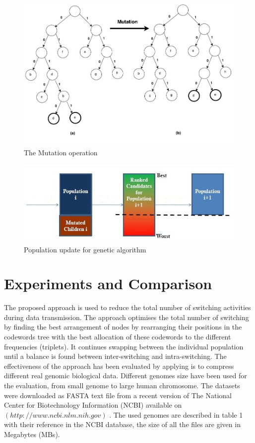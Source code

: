 \documentclass[preprint,12pt]{elsarticle}
\begin{document}
\begin{figure}[tbph]
\begin{center}
\includegraphics[scale=0.4]{Images/figure2.jpg}
\caption{The Mutation operation}
\end{center}
\label{Fig2}
\end{figure}

\begin{figure}[tbph]
\begin{center}
\includegraphics[scale=0.7]{Images/Drawing_1.jpg}
\caption{Population update for genetic algorithm}
\end{center}
\label{Fig3}
\end{figure}


\section{Experiments and Comparison}
The proposed approach is used to reduce the total number of switching activities during data transmission. The approach optimises the total number of switching by  finding  the best arrangement of nodes by rearranging their positions in the codewords tree with the best allocation of these codewords to the different frequencies (triplets). It continues swapping between the individual population  until a balance is found between inter-switching and intra-switching. The effectiveness of the approach has been evaluated by applying is to compress different real genomic biological data. Different genomes size have been used for the evaluation, from small genome to large human chromosome. The datasets were downloaded as FASTA text file from a recent version of The National Center for Biotechnology Information (NCBI) available on $(http://www.ncbi.nlm.nih.gov)$ \cite{pruitt2009ncbi}. The used genomes are described in table 1 with their reference in the NCBI database, the size of all the files are given in Megabytes (MBs).
\end{document}
